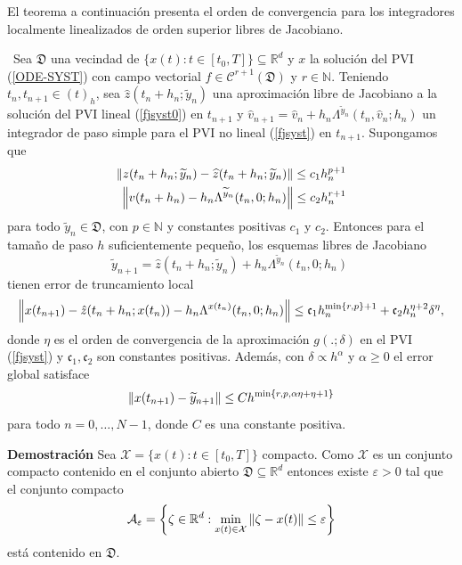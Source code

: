 El teorema a continuación presenta el orden de convergencia para los integradores localmente linealizados de orden superior libres de Jacobiano.

\begin{theorem} \label{theorem:fj-llrk-convergence}
\cite{naranjo2023jacobian}~Sea $\mathfrak{D}$ una vecindad de $\{x(t):t\in [t_0,T]\} \subseteq \mathbb{R}^{d}$ y $x$ la solución del PVI (\ref{ODE-SYST}) con campo vectorial $f\in \mathcal{C}^{r+1}(\mathfrak{D})$ y $r \in \mathbb{N}$. Teniendo $t_n,t_{n+1}\in (t)_h$, sea $\hat{z}(t_n+h_n;\widetilde{y}_n)$ una aproximación libre de Jacobiano a la solución del PVI lineal (\ref{fjsyst0}) en $t_{n+1}$ y  $\widehat{v}_{n+1}=\widehat{v}_n+h_n\Lambda^{\widetilde{y}_n}(t_n,\widehat{v}_n;h_n)$ un integrador de paso simple para el PVI no lineal (\ref{fjsyst}) en $t_{n+1}$. Supongamos que
\begin{align}
	\left\lVert z(t_n+h_n;\widetilde{y}_n)-\widehat{z}(t_n+h_n;\widetilde{y}_n) \right\rVert \leq c_1 h_n^{p+1} \\
	\left\lVert v(t_n+h_n)-h_n\Lambda^{\widetilde{y}_n}(t_n,0;h_n) \right\rVert\leq c_2 h_n^{r+1}  \label{ineq:bound32}
\end{align}
para todo $\widetilde{y}_n \in \mathfrak{D}$, con  $p \in \mathbb{N}$ y constantes positivas  $c_1$ y $c_2$. Entonces para el tamaño de paso $h$ suficientemente pequeño, los esquemas libres de Jacobiano
\begin{equation*}
    \widetilde{y}_{n+1}= \hat{z}(t_n+h_n;\widetilde{y}_n)+h_n\Lambda^{\widetilde{y}_n}(t_n,0;h_n)\;
\end{equation*}
tienen error de truncamiento local
\begin{equation*}
    \left\lVert x(t_{n+1})-\hat{z}(t_n+h_n;x(t_n))-h_n\Lambda^{x(t_n)}(t_n,0;h_n) \right\rVert\leq \mathfrak{c}_1 h_n^{\min\{r,p\}+1} + \mathfrak{c}_2 h_n^{\eta+2}\delta^{\eta},
\end{equation*}
donde $\eta$ es el orden de convergencia de la aproximación $g(.;\delta)$ en el PVI (\ref{fjsyst}) y $\mathfrak{c}_1,\mathfrak{c}_2$ son constantes positivas. Además, con $\delta\propto h^{\alpha}$ y  $\alpha \geq 0$ el error global satisface
\begin{equation*}
    \left\lVert x(t_{n+1})-\widetilde{y}_{n+1} \right\rVert\leq Ch^{\min\{r,p,\alpha\eta+\eta+1\}}
\end{equation*}
para todo  $n=0,\ldots,N-1$, donde $C$ es una constante positiva.
\end{theorem}

\textbf{Demostración}
Sea $\mathcal{X}=\{ x(t): t\in [t_0,T] \}$ compacto. Como $\mathcal{X}$ es un conjunto compacto contenido en el conjunto abierto $\mathfrak{D}\subseteq \mathbb{R}^d$ entonces existe $\varepsilon>0$ tal que el conjunto compacto
\begin{equation*}
    \mathcal{A}_{\varepsilon}=\left\{ \zeta \in\mathbb{R}^d: \min\limits_{x(t)\in \mathcal{X}}\left\lVert \zeta -x(t) \right\rVert\leq \varepsilon \right\}
\end{equation*}
está contenido en $\mathfrak{D}$.

